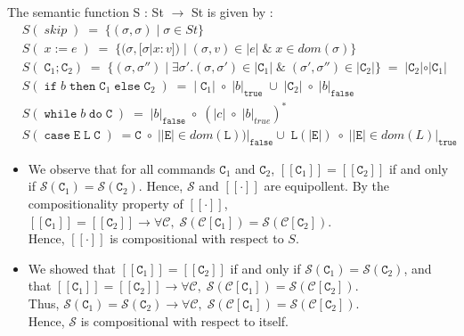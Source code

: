 \documentclass{article}
\newcommand{\E}{\mathtt{E}}
\newcommand{\C}{\mathtt{C}}
\newcommand{\LL}{\mathtt{L}}
\newcommand{\true}{\mathtt{true}}
\newcommand{\false}{\mathtt{false}}
\newcommand{\ifsym}{\mathtt{if}}
\newcommand{\then}{\mathtt{then}}
\newcommand{\elsesym}{\mathtt{else}}
\newcommand{\whilesym}{\mathtt{while}}
\newcommand{\dosym}{\mathtt{do}}
\newcommand{\case}{\mathtt{case}}
\begin{document}
\begin{enumerate}
The semantic function S : St $\rightarrow$ St is given by :
\begin{align*}
& S( \; skip \; ) \; = \; \{ (\sigma, \sigma) \; | \; \sigma \in St \} \\
& S( \; x := e \; ) \; = \; \{ (\sigma, [\sigma | x : v]) \; | \; (\sigma, v)
\in | e | \; \& \; x \in dom(\sigma) \} \\
& S( \; \C_1 ; \C_2 ) \;  = \; \{ (\sigma, \sigma'') \; | \; \exists
\sigma'.(\sigma, \sigma') \in | \C_1 | \; \&  \; (\sigma',\sigma'') \in | \C_2 | \} 
\; = \; | \C_2 | \circ | \C_1 | \\
& S( \; \ifsym \; b \; \then  \; \C_1 \; \elsesym \; \C_2 \; ) \; = \; | \;
\C_1 | \; \circ  \; | b |_{\true} \; \cup \; |\C_2| \; \circ \; | b |_{\false} \\
& S( \; \whilesym \; b \; \dosym \; \C \; ) \; = \; | b |_{\false} \; \circ \;
(|c| \; \circ \; | b |_{true} )^{*} \\
& S( \; \case \; \E \; \LL \; \C \; ) \; = \C \; \circ \; | |\E| \in
dom(\LL) ) |_{\false} \cup \; \LL(|\E|) \; \circ \; | |\E| \in dom(L) |_{\true} 
\end{align*}

\begin{itemize}
  
\item We observe that for all commands $\C_1$ and $\C_2$, 
$[[\C_1]] = [[\C_2]]$ if and only if $\mathcal{S}(\C_1) = \mathcal{S}(\C_2)$. 
Hence, $\mathcal{S}$ and $[[\cdot]]$ are 
equipollent. By the compositionality property of $[[\cdot]]$,\\

$[[\C_1]] = [[\C_2]] \rightarrow  
 \forall \mathcal{C}, \;	
 \mathcal{S}(\mathcal{C}[\C_1]) = \mathcal{S}(\mathcal{C}[\C_2])$. \\

Hence, $[[\cdot]]$ is compositional with respect to $S$.

\item We showed that $[[\C_1]] = [[\C_2]]$ if and only if $\mathcal{S}(\C_1) =
\mathcal{S}(\C_2)$, and that 
$[[\C_1]] = [[\C_2]] \rightarrow  \forall
\mathcal{C}, \; \mathcal{S}(\mathcal{C}[\C_1]) = \mathcal{S}(\mathcal{C}[\C_2])$. \\

 Thus,  $\mathcal{S}(\C_1) = \mathcal{S}(\C_2) \rightarrow  \forall \mathcal{C},
 \; \mathcal{S}(\mathcal{C}[\C_1]) = \mathcal{S}(\mathcal{C}[\C_2])$. \\
 
 Hence, $\mathcal{S}$ is compositional with respect to itself.


\end{itemize}
\end{enumerate}
\end{document}
